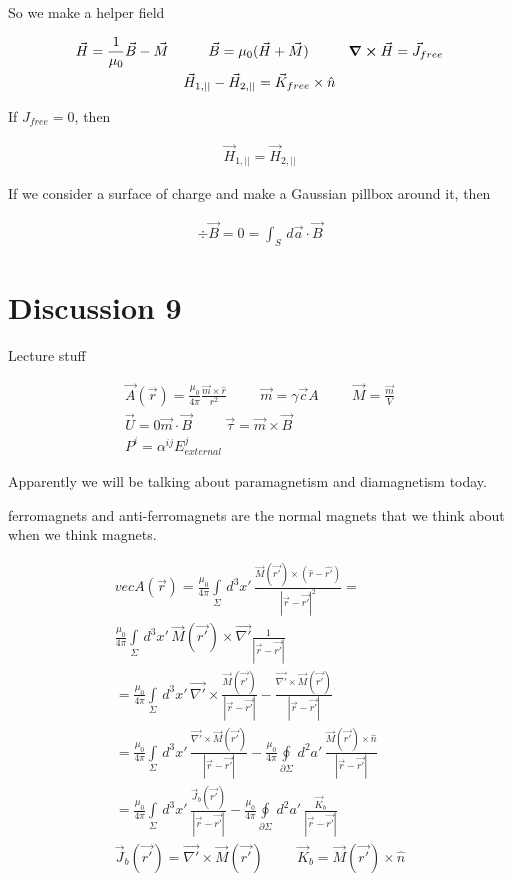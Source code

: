 \documentclass[fleqn]{report}
\newcommand{\hp}{\hspace{1cm}}
\newcommand{\del}{\partial}
\newcommand{\equations} [1] {
\begin{gather*}
#1
\end{gather*}
}
\begin{document}
So we make a helper field 

\equations{
    \vec H
    =
    \frac{1}{\mu_0}
    \vec B 
    -
    \vec M
    \hp 
    \vec B 
    =
    \mu_0 
    (\vec H + \vec M)
    \hp 
    \curl \vec H = \vec J_{free}
    \\
    \vec H_{1, ||}
    -
    \vec H_{2, ||}
    =
    \vec K_{free} \times \hat n
}

If $J_{free} = 0$, then 

\equations{
    \vec H_{1, ||}
    =
    \vec H_{2, ||}
}

If we consider a surface of charge and make a Gaussian pillbox around it, then 
\equations{
    \div \vec B 
    =
    0
    =
    \int_S \, d \vec a \cdot 
    \vec B 
}

\section{Discussion 9}
Lecture stuff 

\equations{
    \vec A(\vec r)
    =
    \frac{\mu_0}{4 \pi}
    \frac{\vec m \times \hat r}{r^2}
    \hp 
    \vec m 
    =
    \gamma \vec cA 
    \hp 
    \vec M 
    =
    \frac{\vec m}{V}
    \\
    \vec U 
    =
    0 \vec m \cdot \vec B 
    \hp 
    \vec \tau 
    =
    \vec m \times \vec B
    \\
    P^i  
    =
    \alpha^{ij}
    E^j_{external}
}

Apparently we will be talking about paramagnetism and diamagnetism today. 

ferromagnets and anti-ferromagnets are the normal magnets that we think 
about when we think magnets. 

\equations{
    vec A(\vec r)
    =
    \frac{\mu_0}{4 \pi}
    \int\limits_{\Sigma} \, d^3 x' \, 
    \frac{\vec M(\vec{r'}) \times (\hat{r} - \hat{r'})}{|\vec r - \vec{r'}|^2}
    =
    \\
    \frac{\mu_0}{4 \pi}
    \int\limits_{\Sigma} \, d^3 x' \, 
    \vec M(\vec{r'}) \times \vec{\nabla'} \frac{1}{|\vec r - \vec{r'}|}
    \\
    =
    \frac{\mu_0}{4 \pi}
    \int\limits_{\Sigma} \, d^3 x' \, 
    \vec{\nabla'} \times \frac{\vec M(\vec{r'})}{|\vec r - \vec{r'}|}
    -
    \frac{\vec{\nabla'} \times \vec M(\vec{r'})}{|\vec r - \vec{r'}|}
    \\
    =
    \frac{\mu_0}{4 \pi}
    \int\limits_{\Sigma} \, d^3 x' \, 
    \frac{\vec{\nabla'} \times \vec M(\vec{r'})}{|\vec r - \vec{r'}|}
    -
    \frac{\mu_0}{4 \pi}
    \oint\limits_{\del \Sigma} \, d^2 a' \, 
    \frac{\vec M(\vec{r'}) \times \hat n}{|\vec r - \vec{r'}|}
    \\
    =
    \frac{\mu_0}{4 \pi}
    \int\limits_{\Sigma} \, d^3 x' \, 
    \frac{\vec J_b(\vec{r'})}{|\vec r - \vec{r'}|}
    -
    \frac{\mu_0}{4 \pi}
    \oint\limits_{\del \Sigma} \, d^2 a' \, 
    \frac{\vec K_b}{|\vec r - \vec{r'}|}
    \\
    \vec J_b(\vec{r'}) 
    = 
    \vec{\nabla'} \times \vec M(\vec{r'})
    \hp
    \vec K_b
    =
    \vec M(\vec{r'}) \times \hat n
}
\end{document}
